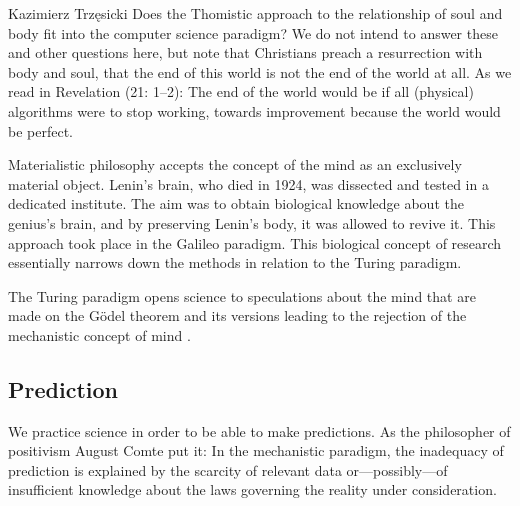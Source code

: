 \begin{artengenv}{Kazimierz Trzęsicki}
Does the Thomistic approach to the relationship of soul and body fit into the computer science paradigm? We do not intend to answer these and other questions here, but note that Christians preach a resurrection with body and soul, that the end of this world is not the end of the world at all. As we read in Revelation (21: 1--2):  The end of the world would be if all (physical) algorithms were to stop working, towards improvement because the world would be perfect.


 Materialistic philosophy accepts the concept of the mind as an exclusively material object. Lenin's brain, who died in 1924, was dissected and tested in a dedicated institute. The aim was to obtain biological knowledge about the genius's brain, and by preserving Lenin's body, it was allowed to revive it. This approach took place in the Galileo paradigm. This biological concept of research essentially narrows down the methods in relation to the Turing paradigm.

The Turing paradigm opens science to speculations about the mind that are made on the G{\"o}del theorem and its versions leading to the rejection of the mechanistic concept of mind \parencite{Krajewski2020}.


\subsection{Prediction} 
We practice science in order to be able to make predictions. As the philosopher of positivism August Comte put it:  In the mechanistic paradigm, the inadequacy of prediction is explained by the scarcity of relevant data or---possibly---of insufficient knowledge about the laws governing the reality under consideration.


\end{artengenv}
